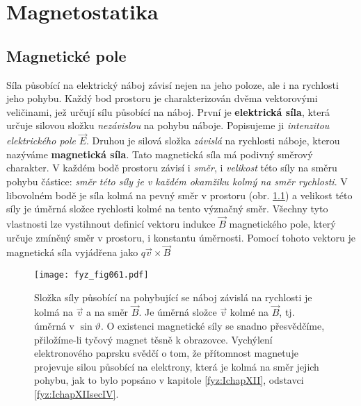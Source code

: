 \setchaptertoc
\chapter{Magnetostatika}\label{fyz:IIchapXIII}


  \section{Magnetické pole}\label{fyz:IIchapXIIIsecI}
    \cite[s.~224]{Feynman02} Síla působící na elektrický náboj závisí nejen na jeho poloze, ale i 
    na rychlosti jeho pohybu. Každý bod prostoru je charakterizován dvěma vektorovými veličinami, 
    jež určují sílu působící na náboj. První je \textbf{elektrická síla}, která určuje silovou 
    složku \emph{nezávislou} na pohybu náboje. Popisujeme ji \emph{intenzitou elektrického pole} 
    \(\vec{E}\). Druhou je silová složka \emph{závislá} na rychlosti náboje, kterou nazýváme 
    \textbf{magnetická síla}. Tato magnetická síla má podivný směrový charakter. V každém bodě 
    prostoru závisí i \emph{směr}, i \emph{velikost} této síly na směru pohybu částice: \emph{směr 
    této síly je v každém okamžiku kolmý na směr rychlosti}. V libovolném bodě je síla kolmá na 
    pevný směr v prostoru (obr. \ref{fyz:fig061}) a velikost této síly je úměrná složce 
    rychlosti kolmé na tento význačný směr. Všechny tyto vlastnosti lze vystihnout definicí vektoru 
    indukce \(\vec{B}\) magnetického pole, který určuje zmíněný směr v prostoru, i konstantu 
    úměrnosti. Pomocí tohoto vektoru je magnetická síla vyjádřena jako \(q\vec{v}\times\vec{B}\)    

    \begin{figure}[ht!]  %
      \centering
      \texttt{[image: fyz\_fig061.pdf]}
      \caption{Složka síly působící na pohybující se náboj závislá na rychlosti je kolmá na 
               \(\vec{v}\) a na směr \(\vec{B}\). Je úměrná složce \(\vec{v}\) kolmé na 
               \(\vec{B}\), tj. úměrná v \(\sin\vartheta\). O existenci magnetické síly se snadno 
                přesvědčíme, přiložíme-li tyčový magnet těsně k obrazovce. Vychýlení elektronového 
                paprsku svědčí o tom, že přítomnost magnetuje projevuje silou působící na 
                elektrony, která je kolmá na směr jejich pohybu, jak to bylo popsáno v kapitole 
                \ref{fyz:IchapXII}, odstavci \ref{fyz:IchapXIIsecIV}.
                \cite[s.~225]{Feynman02}}
      \label{fyz:fig061}
    \end{figure}
    
